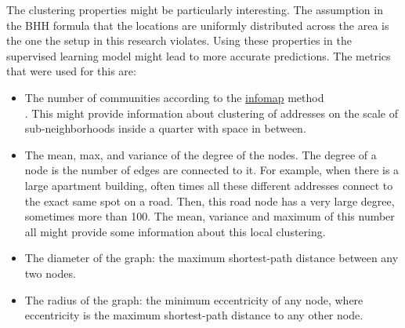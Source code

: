 The clustering properties might be particularly interesting. The assumption in the BHH formula that the locations are uniformly distributed across the area is
the one the setup in this research violates. Using these properties in the supervised learning model might lead to more accurate predictions. The metrics that were
used for this are:
\begin{itemize}
	\item The number of communities according to the \url{infomap} method\\ \citep{rosvall2008maps}. This might provide information about clustering of
	      addresses on the scale of sub-neighborhoods inside a quarter with space in between.
	\item The mean, max, and variance of the degree of the nodes. The degree of a node is the number of edges are connected to it.
	      For example, when there is a large apartment building, often times all these different addresses connect to the exact same spot on a road.
	      Then, this road node has a very large degree, sometimes more than 100. The mean, variance and maximum of this number all might provide some information
	      about this local clustering.
	\item The diameter of the graph: the maximum shortest-path distance between any two nodes.
	\item The radius of the graph: the minimum eccentricity of any node, where eccentricity is the maximum shortest-path distance to any other node.
\end{itemize}
